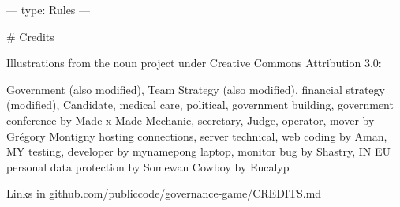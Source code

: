 ---
type: Rules
---

# Credits

Illustrations from the noun project under Creative Commons Attribution 3.0:

Government (also modified), Team Strategy (also modified), financial strategy (modified), Candidate, medical care, political, government building, government conference by Made x Made
Mechanic, secretary, Judge, operator, mover by Grégory Montigny
hosting connections, server technical, web coding by Aman, MY
testing, developer by mynamepong
laptop, monitor bug by Shastry, IN
EU personal data protection by Somewan
Cowboy by Eucalyp

Links in github.com/publiccode/governance-game/CREDITS.md
